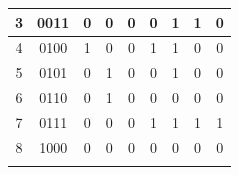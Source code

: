 \documentclass[12pt]{article}
\begin{document}
\begin{table}[h]
\begin{tabular}{ | c | c | c | c | c | c | c | c | c | }
  3                                                                      & 0011                                                                    & 0                             & 0                             & 0                             & 0                             & 1                             & 1                             & 0                             \\ \hline \rule{0em}{1.15em}
  4                                                                      & 0100                                                                    & 1                             & 0                             & 0                             & 1                             & 1                             & 0                             & 0                             \\ \hline \rule{0em}{1.15em}
  5                                                                      & 0101                                                                    & 0                             & 1                             & 0                             & 0                             & 1                             & 0                             & 0                             \\ \hline \rule{0em}{1.15em}
  6                                                                      & 0110                                                                    & 0                             & 1                             & 0                             & 0                             & 0                             & 0                             & 0                             \\ \hline \rule{0em}{1.15em}
  7                                                                      & 0111                                                                    & 0                             & 0                             & 0                             & 1                             & 1                             & 1                             & 1                             \\ \hline \rule{0em}{1.15em}
  8                                                                      & 1000                                                                    & 0                             & 0                             & 0                             & 0                             & 0                             & 0                             & 0                             \\ \hline \rule{0em}{1.15em}

\end{tabular}
\end{table}
\end{document}
